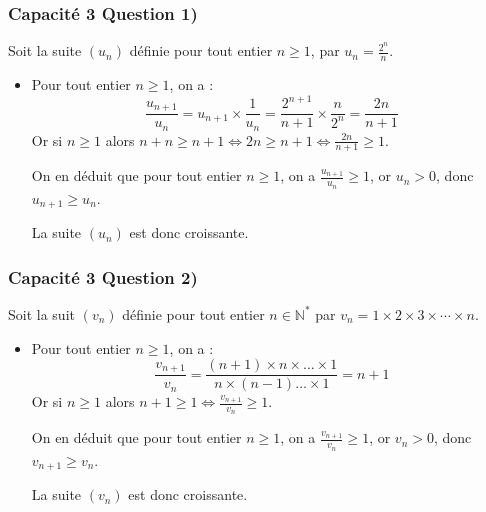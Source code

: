 \documentclass[11pt, hyperref={urlcolor=red,%
            linkcolor=blue, %
            colorlinks=true}]{beamer}
\newcommand{\N}{\mathbb{N}}
\newcommand{\suite}[1]{\ensuremath{\left(#1_{n}\right)}}
\begin{document}
\begin{frame}
\frametitle{Capacité 3 Question 1)}
\label{capacite3}


Soit la suite $\suite{u}$ définie  pour tout entier $n \geqslant 1$, par  $u_{n}=\frac{2^n}{n}$.
 
 
\begin{itemize}

\pause \item Pour tout entier $n \geqslant 1$, on a :
\begin{equation*}
\frac{u_{n+1}}{u_{n}}=u_{n+1}\times \frac{1}{u_{n}}=\frac{2^{n+1}}{n+1}\times \frac{n}{2^{n}}=\frac{2n}{n+1}
\end{equation*}
Or si $n \geqslant 1$ alors  $n + n \geqslant n + 1 \Leftrightarrow 2n \geqslant n +1 \Leftrightarrow \frac{2n}{n+1} \geqslant 1$.

On en déduit que pour tout entier $n \geqslant 1$, on a $\frac{u_{n+1}}{u_{n}}\geqslant 1$, or $u_{n}>0$, donc $u_{n+1} \geqslant u_{n}$.

La suite $\suite{u}$ est donc croissante.

\end{itemize}

 
\end{frame}




\begin{frame}
\frametitle{Capacité 3 Question 2)}



Soit la suit $\suite{v}$ définie pour tout entier $n \in \N^{*}$ par $v_{n}=1 \times 2 \times 3 \times \cdots \times n$.
 
 
\begin{itemize}

\pause \item Pour tout entier $n \geqslant 1$, on a :
\begin{equation*}
\frac{v_{n+1}}{v_{n}}=\frac{(n+1) \times n \times \ldots \times 1}{n \times (n-1)\ldots \times 1}=n+1
\end{equation*}
Or si $n \geqslant 1$ alors  $n + 1\geqslant 1  \Leftrightarrow \frac{v_{n+1}}{v_{n}} \geqslant 1$.

On en déduit que pour tout entier $n \geqslant 1$, on a $\frac{v_{n+1}}{v_{n}}\geqslant 1$, or $v_{n}>0$, donc $v_{n+1} \geqslant v_{n}$.

La suite $\suite{v}$ est donc croissante.

\end{itemize}

 
\end{frame}
\end{document}
